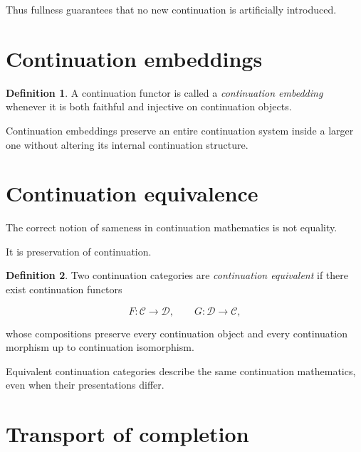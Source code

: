 \documentclass[13pt,openany]{book}
\theoremstyle{plain}
\theoremstyle{definition}
\newtheorem{definition}{Definition}[chapter]
\begin{document}
Thus fullness guarantees that no new continuation is artificially introduced.

\section{Continuation embeddings}

\begin{definition}

A continuation functor is called a
\emph{continuation embedding}
whenever it is both faithful and injective on continuation objects.

\end{definition}

Continuation embeddings preserve an entire continuation system inside a larger
one without altering its internal continuation structure.

\section{Continuation equivalence}

The correct notion of sameness in continuation mathematics is not equality.

It is preservation of continuation.

\begin{definition}

Two continuation categories are
\emph{continuation equivalent}
if there exist continuation functors

\[
F:\mathcal C\rightarrow\mathcal D,
\qquad
G:\mathcal D\rightarrow\mathcal C,
\]

whose compositions preserve every continuation object and every continuation
morphism up to continuation isomorphism.

\end{definition}

Equivalent continuation categories describe the same continuation mathematics,
even when their presentations differ.

\section{Transport of completion}
\end{document}

